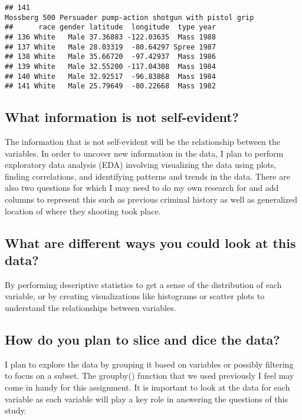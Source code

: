 \documentclass[
]{article}
\begin{document}
\begin{verbatim}
## 141                                                                                                                                                                                   Mossberg 500 Persuader pump-action shotgun with pistol grip
##      race gender latitude  longitude  type year
## 136 White   Male 37.36883 -122.03635  Mass 1988
## 137 White   Male 28.03319  -80.64297 Spree 1987
## 138 White   Male 35.66720  -97.42937  Mass 1986
## 139 White   Male 32.55200 -117.04308  Mass 1984
## 140 White   Male 32.92517  -96.83868  Mass 1984
## 141 White   Male 25.79649  -80.22668  Mass 1982
\end{verbatim}

\subsection{What information is not
self-evident?}\label{what-information-is-not-self-evident}

The information that is not self-evident will be the relationship
between the variables. In order to uncover new information in the data,
I plan to perform exploratory data analysis (EDA) involving visualizing
the data using plots, finding correlations, and identifying patterns and
trends in the data. There are also two questions for which I may need to
do my own research for and add columns to represent this such as
previous criminal history as well as generalized location of where they
shooting took place.

\subsection{What are different ways you could look at this
data?}\label{what-are-different-ways-you-could-look-at-this-data}

By performing descriptive statistics to get a sense of the distribution
of each variable, or by creating visualizations like histograms or
scatter plots to understand the relationships between variables.

\subsection{How do you plan to slice and dice the
data?}\label{how-do-you-plan-to-slice-and-dice-the-data}

I plan to explore the data by grouping it based on variables or possibly
filtering to focus on a subset. The groupby() function that we used
previously I feel may come in handy for this assignment. It is important
to look at the data for each variable as each variable will play a key
role in answering the questions of this study.
\end{document}
